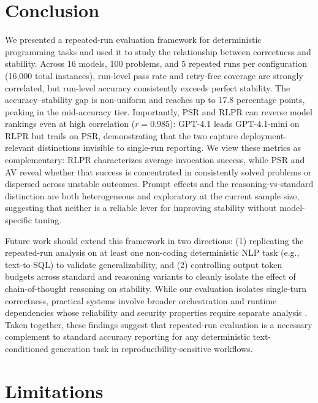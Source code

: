 \documentclass[11pt]{article}
\begin{document}
\section{Conclusion}

We presented a repeated-run evaluation framework for deterministic programming tasks and used it to study the relationship between correctness and stability. Across 16 models, 100 problems, and 5 repeated runs per configuration (16{,}000 total instances), run-level pass rate and retry-free coverage are strongly correlated, but run-level accuracy consistently exceeds perfect stability. The accuracy--stability gap is non-uniform and reaches up to 17.8 percentage points, peaking in the mid-accuracy tier. Importantly, PSR and RLPR can reverse model rankings even at high correlation ($r=0.985$): GPT-4.1 leads GPT-4.1-mini on RLPR but trails on PSR, demonstrating that the two capture deployment-relevant distinctions invisible to single-run reporting. We view these metrics as complementary: RLPR characterizes average invocation success, while PSR and AV reveal whether that success is concentrated in consistently solved problems or dispersed across unstable outcomes. Prompt effects and the reasoning-vs-standard distinction are both heterogeneous and exploratory at the current sample size, suggesting that neither is a reliable lever for improving stability without model-specific tuning.

Future work should extend this framework in two directions: (1) replicating the repeated-run analysis on at least one non-coding deterministic NLP task (e.g., text-to-SQL) to validate generalizability, and (2) controlling output token budgets across standard and reasoning variants to cleanly isolate the effect of chain-of-thought reasoning on stability. While our evaluation isolates single-turn correctness, practical systems involve broader orchestration and runtime dependencies whose reliability and security properties require separate analysis \cite{jiang2026agenticaicybersecurityattack}. Taken together, these findings suggest that repeated-run evaluation is a necessary complement to standard accuracy reporting for any deterministic text-conditioned generation task in reproducibility-sensitive workflows.

\section*{Limitations}
\end{document}
